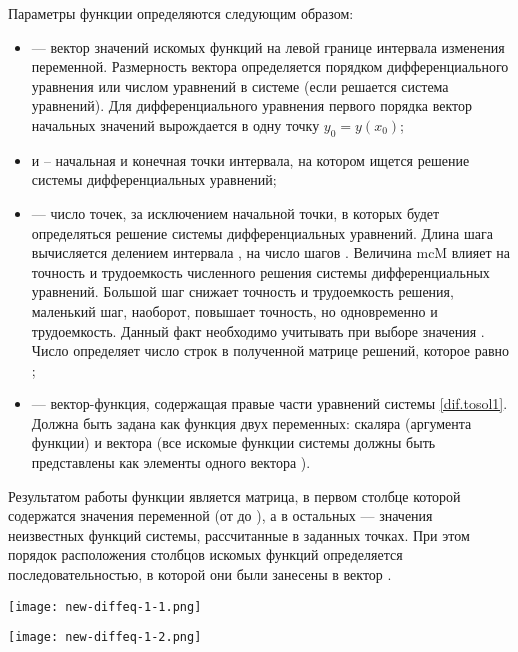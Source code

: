 Параметры функции  определяются следующим образом:
\begin{itemize}[label={}]
	\item {} --- вектор значений искомых функций на левой границе интервала изменения переменной. Размерность вектора определяется порядком дифференциального уравнения или числом уравнений в системе (если решается система уравнений). Для дифференциального уравнения первого порядка вектор начальных значений вырождается в одну точку $y_0 = y(x_0)$;
	\item {} и  – начальная и конечная точки интервала, на котором ищется решение системы дифференциальных уравнений;
	\item {} --- число точек, за исключением начальной точки, в которых будет определяться решение системы дифференциальных уравнений. Длина шага вычисляется делением интервала , на число шагов . Величина mc{M} влияет на точность и трудоемкость численного решения системы дифференциальных уравнений. Большой шаг снижает точность и трудоемкость решения, маленький шаг, наоборот, повышает точность, но одновременно и трудоемкость. Данный факт необходимо учитывать при выборе значения . Число  определяет число строк в полученной матрице решений, которое равно ;
	\item {} --- вектор-функция, содержащая правые части уравнений системы \ref{dif.tosol1}. Должна быть задана как функция двух переменных: скаляра  (аргумента функции) и вектора  (все искомые функции системы должны быть представлены как элементы одного вектора ).
\end{itemize}

Результатом работы функции  является матрица, в первом столбце которой содержатся значения переменной  (от  до ), а в остальных --- значения неизвестных функций системы, рассчитанные в заданных точках. При этом порядок расположения столбцов искомых функций определяется последовательностью, в которой они были занесены в вектор .


\begin{center}
	\texttt{[image: new-diffeq-1-1.png]}
\end{center}
\begin{center}
	\texttt{[image: new-diffeq-1-2.png]}
\end{center}

